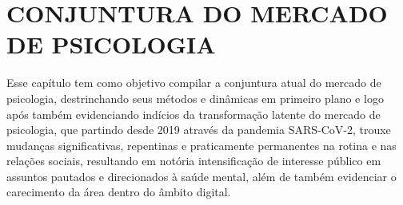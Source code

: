 \chapter{CONJUNTURA DO MERCADO DE PSICOLOGIA}
\label{chap:conjunturaPsicologia}

Esse capítulo tem como objetivo compilar a conjuntura atual do mercado de psicologia, destrinchando seus métodos e dinâmicas em primeiro plano e logo após também  evidenciando indícios da transformação latente do mercado de psicologia, que partindo desde 2019 através da pandemia SARS-CoV-2, trouxe mudanças significativas, repentinas e praticamente permanentes na rotina e nas relações sociais, resultando em notória intensificação de interesse público em assuntos pautados e direcionados à saúde mental, além de também evidenciar o carecimento da área dentro do âmbito digital.



